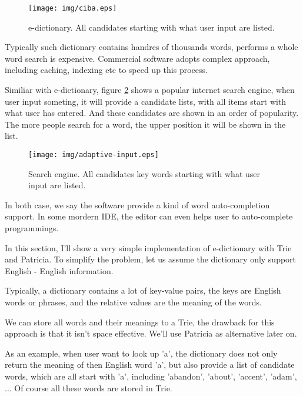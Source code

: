 \documentclass{article}
\begin{document}
\begin{figure}[htbp]
       \begin{center}
	\texttt{[image: img/ciba.eps]}
        \caption{e-dictionary. All candidates starting with what user input are listed.}
        \label{fig:e-dict}
       \end{center}
\end{figure}

Typically such dictionary contains handres of thousands words, performs a whole
word search is expensive. Commercial software adopts complex approach, including
caching, indexing etc to speed up this process.

Similiar with e-dictionary, figure \ref{fig:word-completion} shows a popular
internet search engine, when user input someting, it will provide a candidate
lists, with all items start with what user has entered. And these candidates
are shown in an order of popularity. The more people search for a word, the
upper position it will be shown in the list.

\begin{figure}[htbp]
       \begin{center}
	\texttt{[image: img/adaptive-input.eps]}
        \caption{Search engine. All candidates key words starting with what user input are listed.}
        \label{fig:word-completion}
       \end{center}
\end{figure}

In both case, we say the software provide a kind of word auto-completion support. 
In some mordern IDE, the editor can even helps user to auto-complete programmings. 

In this section, I'll show a very simple implementation of e-dictionary with Trie
and Patricia.
To simplify the problem, let us assume the dictionary only support English - English
information.

Typically, a dictionary contains a lot of key-value pairs, the keys are English
words or phrases, and the relative values are the meaning of the words.

We can store all words and their meanings to a Trie, the drawback for this 
approach is that it isn't space effective. We'll use Patricia as alternative
later on.

As an example, when user want to look up 'a', the dictionary does not only
return the meaning of then English word 'a', but also provide a list of 
candidate words, which are all start with 'a', including 'abandon', 'about',
'accent', 'adam', ... Of course all these words are stored in Trie.
\end{document}
